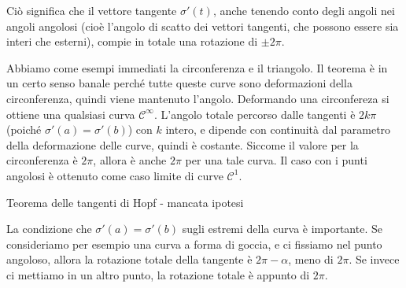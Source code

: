 \documentclass[a4paper]{article}
\begin{document}
Ciò significa che il vettore tangente \(\sigma'(t)\),
anche tenendo conto degli angoli nei angoli angolosi (cioè l'angolo di scatto dei vettori tangenti,
che possono essere sia interi che esterni),
compie in totale una rotazione
di \(\pm 2\pi\).

Abbiamo come esempi immediati la circonferenza e il triangolo.
Il teorema è in un certo senso banale perché tutte queste curve sono
deformazioni della circonferenza,
quindi viene mantenuto l'angolo.
Deformando una circonfereza si ottiene una qualsiasi curva \(\mathcal C^\infty\).
L'angolo totale percorso dalle tangenti è \(2k\pi\) (poiché \(\sigma'(a) = \sigma'(b)\))
con \(k\) intero, e dipende con continuità
dal parametro della deformazione delle curve, quindi è costante.
Siccome il valore per la circonferenza è \(2\pi\), allora è anche \(2\pi\)
per una tale curva.
Il caso con i punti angolosi è ottenuto come caso limite di curve \(\mathcal C^1\).

\begin{snippetexample}{Teorema delle tangenti di Hopf - mancata ipotesi}
    \begin{figure}
        \begin{center}
        \end{center}
    \end{figure}
    La condizione che \(\sigma'(a) = \sigma'(b)\) sugli estremi della curva è importante.
    Se consideriamo per esempio una curva a forma di goccia, e ci fissiamo nel punto angoloso,
    allora la rotazione totale della tangente è \(2\pi - \alpha\), meno di \(2\pi\).
    Se invece ci mettiamo in un altro punto, la rotazione totale è appunto di \(2\pi\).
    \wrapfill
\end{snippetexample}
\end{document}
